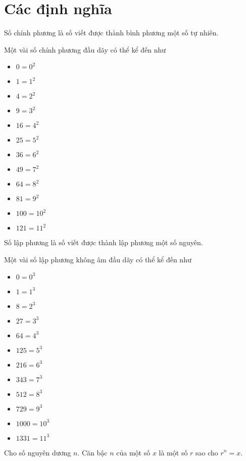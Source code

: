 \section*{Các định nghĩa}
\begin{dx}
Số chính phương là số viết được thành bình phương một số tự nhiên.
\end{dx}
Một vài số chính phương đầu dãy có thể kể đến như
\begin{multicols}{4}
\begin{itemize}
    \item $0=0^2$ 
    \item $1=1^2$ 
    \item $4=2^2$ 
    \item $9=3^2$ 
    \item $16=4^2$
    \item $25=5^2$
    \item $36=6^2$
    \item $49=7^2$
    \item $64=8^2$
    \item $81=9^2$
    \item $100=10^2$
    \item $121=11^2$
\end{itemize}
\end{multicols}

\begin{dx}
Số lập phương là số viết được thành lập phương một số nguyên.
\end{dx}
Một vài số lập phương không âm đầu dãy có thể kể đến như
\begin{multicols}{4}
\begin{itemize}
    \item $0=0^3$ 
    \item $1=1^3$ 
    \item $8=2^3$ 
    \item $27=3^3$ 
    \item $64=4^3$
    \item $125=5^3$
    \item $216=6^3$
    \item $343=7^3$
    \item $512=8^3$
    \item $729=9^3$
    \item $1000=10^3$
    \item $1331=11^3$
\end{itemize}
\end{multicols}

\begin{dx}
Cho số nguyên dương $n.$ Căn bậc $n$ của một số $x$ là một số $r$ sao cho $r^n=x.$
\end{dx}

